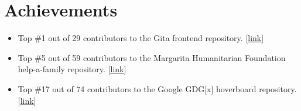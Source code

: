 \documentclass[letterpaper,11pt]{article}
\newcommand{\resumeItem}[1]{
  \item\small{
    {#1 \vspace{-2pt}}
  }
}
\newcommand{\resumeItemListStart}{\begin{itemize}}
\newcommand{\resumeItemListEnd}{\end{itemize}\vspace{-5pt}}
\begin{document}
\section{Achievements}
  \resumeItemListStart
      \resumeItem{Top \#1 out of 29 contributors to the Gita frontend repository. [\href {https://github.com/gita/bg-frontend/graphs/contributors} {\underline{link}}]}
      \vspace{-4pt}
      \resumeItem{Top \#5 out of 59 contributors to the Margarita Humanitarian Foundation help-a-family repository. [\href {https://github.com/margaritahumanitarian/helpafamily/graphs/contributors} {\underline{link}}]}
      \vspace{-4pt}
      \resumeItem{Top \#17 out of 74 contributors to the Google GDG[x] hoverboard repository. [\href {https://github.com/gdg-x/hoverboard/graphs/contributors} {\underline{link}}]}
      \vspace{-4pt}
  \resumeItemListEnd
  \vspace{-15pt}
\end{document}
